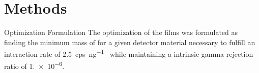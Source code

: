 \documentclass[compress]{beamer}
\begin{document}
\section{Methods}
\begin{frame}{Optimization Formulation}
The optimization of the films was formulated as finding the minimum mass of  for a given detector material necessary to fulfill an interaction rate of \SI{2.5}{cps\per\nano\gram{}} while maintaining a intrinsic gamma rejection ratio of \num{1.e-6}.
\end{frame}
\end{document}
